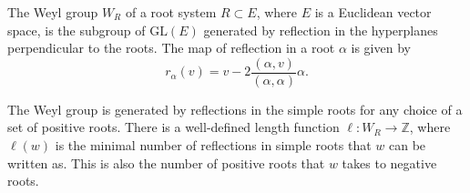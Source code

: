 \documentclass[12pt]{article}
\begin{document}
The Weyl group $W_R$ of a root system $R\subset E$, where $E$ is a Euclidean vector space,
is the subgroup of $\mathrm{GL}(E)$ generated by reflection in the hyperplanes perpendicular
to the roots.  The map of reflection in a root $\alpha$ is given by  
$$r_{\alpha}(v)=v-2\frac{(\alpha,v)}{(\alpha,\alpha)}\alpha.$$

The Weyl group is generated by reflections in the simple roots for any choice of a set of positive roots.
There is a well-defined length function $\ell:W_R\to\mathbb{Z}$, where $\ell(w)$ is the minimal 
number of reflections in simple roots that $w$ can be written as.  This is also the number of positive
roots that $w$ takes to negative roots.
\end{document}

